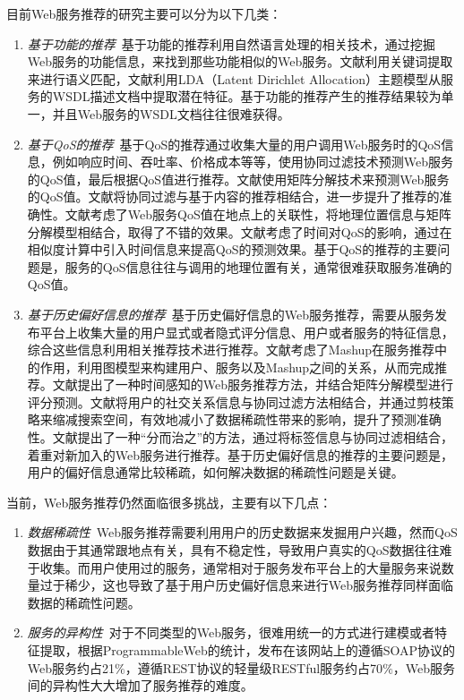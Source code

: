 \documentclass[master,winfonts]{njuthesis}
\begin{document}
目前Web服务推荐的研究主要可以分为以下几类：
\begin{enumerate}
\item \emph{基于功能的推荐}~基于功能的推荐利用自然语言处理的相关技术，通过挖掘Web服务的功能信息，来找到那些功能相似的Web服务。文献\cite{Dong2004Similarity}利用关键词提取来进行语义匹配，文献\cite{Li2013A}利用LDA（Latent Dirichlet Allocation）主题模型从服务的WSDL描述文档中提取潜在特征。基于功能的推荐产生的推荐结果较为单一，并且Web服务的WSDL文档往往很难获得。

\item \emph{基于QoS的推荐}~基于QoS的推荐通过收集大量的用户调用Web服务时的QoS信息，例如响应时间、吞吐率、价格成本等等，使用协同过滤技术预测Web服务的QoS值，最后根据QoS值进行推荐。文献\cite{Zheng2013Collaborative}使用矩阵分解技术来预测Web服务的QoS值。文献\cite{Yao2013Recommending}将协同过滤与基于内容的推荐相结合，进一步提升了推荐的准确性。文献\cite{Qi2015Personalized}考虑了Web服务QoS值在地点上的关联性，将地理位置信息与矩阵分解模型相结合，取得了不错的效果。文献\cite{Li2017Temporal}考虑了时间对QoS的影响，通过在相似度计算中引入时间信息来提高QoS的预测效果。基于QoS的推荐的主要问题是，服务的QoS信息往往与调用的地理位置有关，通常很难获取服务准确的QoS值。

\item \emph{基于历史偏好信息的推荐}~基于历史偏好信息的Web服务推荐，需要从服务发布平台上收集大量的用户显式或者隐式评分信息、用户或者服务的特征信息，综合这些信息利用相关推荐技术进行推荐。文献\cite{Gao2016Joint}考虑了Mashup在服务推荐中的作用，利用图模型来构建用户、服务以及Mashup之间的关系，从而完成推荐。文献\cite{Tian2014Time}提出了一种时间感知的Web服务推荐方法，并结合矩阵分解模型进行评分预测。文献\cite{Qi2017Data}将用户的社交关系信息与协同过滤方法相结合，并通过剪枝策略来缩减搜索空间，有效地减小了数据稀疏性带来的影响，提升了预测准确性。文献\cite{Zhang2017Recommendation}提出了一种“分而治之”的方法，通过将标签信息与协同过滤相结合，着重对新加入的Web服务进行推荐。基于历史偏好信息的推荐的主要问题是，用户的偏好信息通常比较稀疏，如何解决数据的稀疏性问题是关键。

\end{enumerate}

当前，Web服务推荐仍然面临很多挑战，主要有以下几点：
\begin{enumerate}
\item \emph{数据稀疏性}~Web服务推荐需要利用用户的历史数据来发掘用户兴趣，然而QoS数据由于其通常跟地点有关，具有不稳定性，导致用户真实的QoS数据往往难于收集。而用户使用过的服务，通常相对于服务发布平台上的大量服务来说数量过于稀少，这也导致了基于用户历史偏好信息来进行Web服务推荐同样面临数据的稀疏性问题。

\item \emph{服务的异构性}~对于不同类型的Web服务，很难用统一的方式进行建模或者特征提取，根据ProgrammableWeb的统计，发布在该网站上的遵循SOAP协议的Web服务约占21$\%$，遵循REST协议的轻量级RESTful服务约占70$\%$，Web服务间的异构性大大增加了服务推荐的难度。

\end{enumerate}
\end{document}
